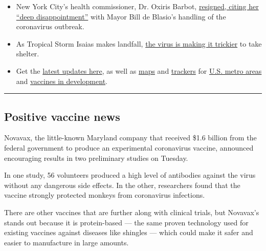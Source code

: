 \begin{itemize}
\item
  New York City's health commissioner, Dr. Oxiris Barbot,
  \href{https://www.nytimes3xbfgragh.onion/2020/08/04/nyregion/oxiris-barbot-health-commissioner-resigns.html}{resigned,
  citing her ``deep disappointment''} with Mayor Bill de Blasio's
  handling of the coronavirus outbreak.
\item
  As Tropical Storm Isaias makes landfall,
  \href{https://www.nytimes3xbfgragh.onion/2020/08/04/world/coronavirus-cases.html?action=click\&module=Top\%20Stories\&pgtype=Homepage\#link-5c0d6427}{the
  virus is making it trickier} to take shelter.
\item
  Get the
  \href{https://www.nytimes3xbfgragh.onion/news-event/coronavirus}{latest
  updates here}, as well as
  \href{https://www.nytimes3xbfgragh.onion/interactive/2020/world/asia/china-wuhan-coronavirus-maps.html?action=click\&pgtype=Article\&state=default\&module=styln-coronavirus\&variant=show\&region=TOP_BANNER\&context=storyline_menu}{maps}
  and
  \href{https://www.nytimes3xbfgragh.onion/interactive/2020/04/03/upshot/coronavirus-metro-area-tracker.html}{trackers}
  for
  \href{https://www.nytimes3xbfgragh.onion/interactive/2020/04/03/upshot/coronavirus-metro-area-tracker.html}{U.S.
  metro areas} and
  \href{https://www.nytimes3xbfgragh.onion/interactive/2020/science/coronavirus-vaccine-tracker.html}{vaccines
  in development}.
\end{itemize}

\begin{center}\rule{0.5\linewidth}{\linethickness}\end{center}

\hypertarget{positive-vaccine-news}{%
\subsection{Positive vaccine news}\label{positive-vaccine-news}}

Novavax, the little-known Maryland company that received \$1.6 billion
from the federal government to produce an experimental coronavirus
vaccine, announced encouraging results in two preliminary studies on
Tuesday.

In one study, 56 volunteers produced a high level of antibodies against
the virus without any dangerous side effects. In the other, researchers
found that the vaccine strongly protected monkeys from coronavirus
infections.

There are other vaccines that are further along with clinical trials,
but Novavax's stands out because it is protein-based --- the same proven
technology used for existing vaccines against diseases like shingles ---
which could make it safer and easier to manufacture in large amounts.

